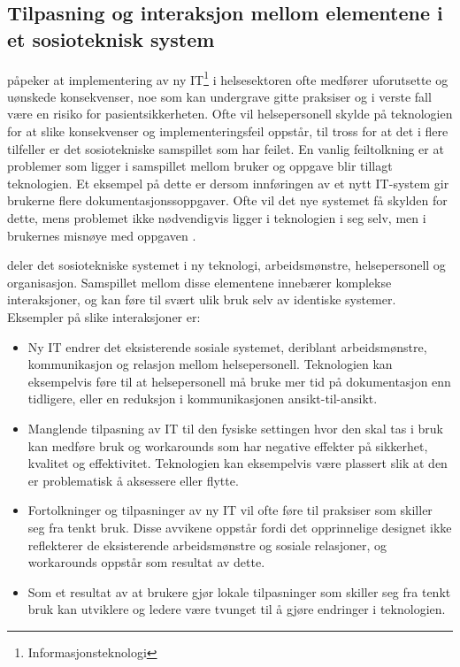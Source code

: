 \subsection{Tilpasning og interaksjon mellom elementene i et sosioteknisk system}
\label{sec:tilpasning}
\citet{Harrison} påpeker at implementering av ny IT\footnote{Informasjonsteknologi} i helsesektoren ofte medfører uforutsette og uønskede konsekvenser, noe som kan undergrave gitte praksiser og i verste fall være en risiko for pasientsikkerheten. Ofte vil helsepersonell skylde på teknologien for at slike konsekvenser og implementeringsfeil oppstår, til tross for at det i flere tilfeller er det sosiotekniske samspillet som har feilet. En vanlig feiltolkning er at problemer som ligger i samspillet mellom bruker og oppgave blir tillagt teknologien. Et eksempel på dette er dersom innføringen av et nytt IT-system gir brukerne flere dokumentasjonssoppgaver. Ofte vil det nye systemet få skylden for dette, mens problemet ikke nødvendigvis ligger i teknologien i seg selv, men i brukernes misnøye med oppgaven \citep{FITT}.

\noindent
\citet{Harrison} deler det sosiotekniske systemet i ny teknologi, arbeidsmønstre, helsepersonell og organisasjon. Samspillet mellom disse elementene innebærer komplekse interaksjoner, og kan føre til svært ulik bruk selv av identiske systemer. Eksempler på slike interaksjoner er:

\begin{itemize}
\item Ny IT endrer det eksisterende sosiale systemet, deriblant arbeidsmønstre, kommunikasjon og relasjon mellom helsepersonell. Teknologien kan eksempelvis føre til at helsepersonell må bruke mer tid på dokumentasjon enn tidligere, eller en reduksjon i kommunikasjonen ansikt-til-ansikt.
\item Manglende tilpasning av IT til den fysiske settingen hvor den skal tas i bruk kan medføre bruk og workarounds som har negative effekter på sikkerhet, kvalitet og effektivitet. Teknologien kan eksempelvis være plassert slik at den er problematisk å aksessere eller flytte.
\item Fortolkninger og tilpasninger av ny IT vil ofte føre til praksiser som skiller seg fra tenkt bruk. Disse avvikene oppstår fordi det opprinnelige designet ikke reflekterer de eksisterende arbeidsmønstre og sosiale relasjoner, og workarounds oppstår som resultat av dette. 
\item Som et resultat av at brukere gjør lokale tilpasninger som skiller seg fra tenkt bruk kan utviklere og ledere være tvunget til å gjøre endringer i teknologien.
\end{itemize} 


